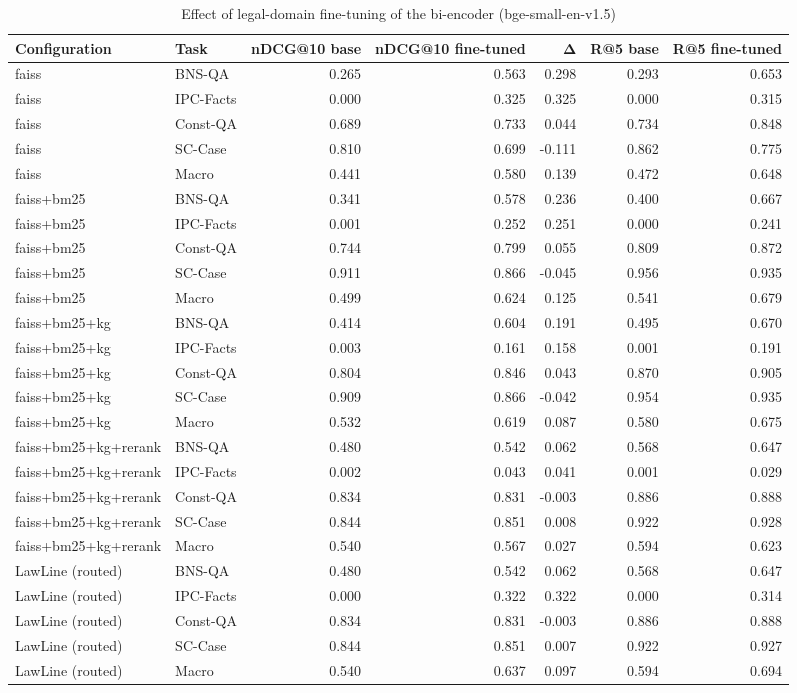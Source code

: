 \begin{table}
\caption{Effect of legal-domain fine-tuning of the bi-encoder (bge-small-en-v1.5)}
\label{tab:finetune}
\begin{tabular}{llrrrrr}
\toprule
Configuration & Task & nDCG@10 base & nDCG@10 fine-tuned & Δ & R@5 base & R@5 fine-tuned \\
\midrule
faiss & BNS-QA & 0.265 & 0.563 & 0.298 & 0.293 & 0.653 \\
faiss & IPC-Facts & 0.000 & 0.325 & 0.325 & 0.000 & 0.315 \\
faiss & Const-QA & 0.689 & 0.733 & 0.044 & 0.734 & 0.848 \\
faiss & SC-Case & 0.810 & 0.699 & -0.111 & 0.862 & 0.775 \\
faiss & Macro & 0.441 & 0.580 & 0.139 & 0.472 & 0.648 \\
faiss+bm25 & BNS-QA & 0.341 & 0.578 & 0.236 & 0.400 & 0.667 \\
faiss+bm25 & IPC-Facts & 0.001 & 0.252 & 0.251 & 0.000 & 0.241 \\
faiss+bm25 & Const-QA & 0.744 & 0.799 & 0.055 & 0.809 & 0.872 \\
faiss+bm25 & SC-Case & 0.911 & 0.866 & -0.045 & 0.956 & 0.935 \\
faiss+bm25 & Macro & 0.499 & 0.624 & 0.125 & 0.541 & 0.679 \\
faiss+bm25+kg & BNS-QA & 0.414 & 0.604 & 0.191 & 0.495 & 0.670 \\
faiss+bm25+kg & IPC-Facts & 0.003 & 0.161 & 0.158 & 0.001 & 0.191 \\
faiss+bm25+kg & Const-QA & 0.804 & 0.846 & 0.043 & 0.870 & 0.905 \\
faiss+bm25+kg & SC-Case & 0.909 & 0.866 & -0.042 & 0.954 & 0.935 \\
faiss+bm25+kg & Macro & 0.532 & 0.619 & 0.087 & 0.580 & 0.675 \\
faiss+bm25+kg+rerank & BNS-QA & 0.480 & 0.542 & 0.062 & 0.568 & 0.647 \\
faiss+bm25+kg+rerank & IPC-Facts & 0.002 & 0.043 & 0.041 & 0.001 & 0.029 \\
faiss+bm25+kg+rerank & Const-QA & 0.834 & 0.831 & -0.003 & 0.886 & 0.888 \\
faiss+bm25+kg+rerank & SC-Case & 0.844 & 0.851 & 0.008 & 0.922 & 0.928 \\
faiss+bm25+kg+rerank & Macro & 0.540 & 0.567 & 0.027 & 0.594 & 0.623 \\
LawLine (routed) & BNS-QA & 0.480 & 0.542 & 0.062 & 0.568 & 0.647 \\
LawLine (routed) & IPC-Facts & 0.000 & 0.322 & 0.322 & 0.000 & 0.314 \\
LawLine (routed) & Const-QA & 0.834 & 0.831 & -0.003 & 0.886 & 0.888 \\
LawLine (routed) & SC-Case & 0.844 & 0.851 & 0.007 & 0.922 & 0.927 \\
LawLine (routed) & Macro & 0.540 & 0.637 & 0.097 & 0.594 & 0.694 \\
\bottomrule
\end{tabular}
\end{table}
